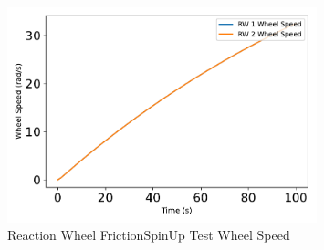 \begin{figure}[htbp]\centerline{\includegraphics[width=0.8\textwidth]{AutoTeX/ReactionWheelFrictionSpinUpTestWheelSpeed}}\caption{Reaction Wheel FrictionSpinUp Test Wheel Speed}\label{fig:ReactionWheelFrictionSpinUpTestWheelSpeed}\end{figure}